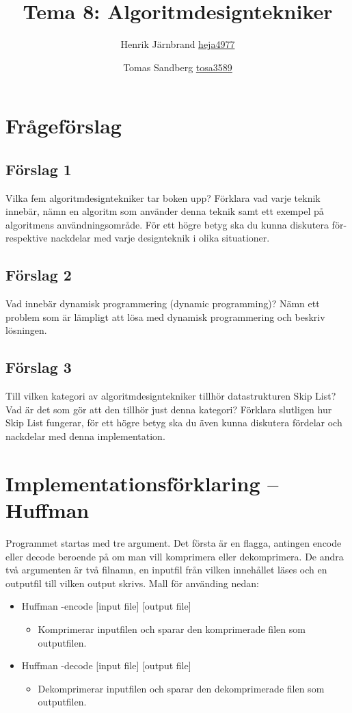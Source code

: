 \documentclass[a5paper,10pt,oneside]{article}
\title{Tema 8: Algoritmdesigntekniker}
\author{Henrik Järnbrand \url{heja4977} \and Tomas Sandberg \url{tosa3589}}
\begin{document}
\maketitle

\section{Frågeförslag}

\subsection{Förslag 1}
Vilka fem algoritmdesigntekniker tar boken upp? Förklara vad varje teknik innebär, nämn en algoritm som använder denna teknik samt ett exempel på algoritmens användningsområde. 
För ett högre betyg ska du kunna diskutera för- respektive nackdelar med varje 
designteknik i olika situationer.

\subsection{Förslag 2}
Vad innebär dynamisk programmering (dynamic programming)? Nämn ett problem som är lämpligt att lösa med dynamisk programmering och beskriv lösningen.

\subsection{Förslag 3}
Till vilken kategori av algoritmdesigntekniker tillhör datastrukturen Skip List?
Vad är det som gör att den tillhör just denna kategori?
Förklara slutligen hur Skip List fungerar, för ett högre betyg ska du även kunna diskutera fördelar och nackdelar med denna implementation.



\section{Implementationsförklaring – Huffman}

Programmet startas med tre argument. Det första är en flagga, antingen encode eller decode beroende på om man vill komprimera eller dekomprimera. De andra två argumenten är två filnamn, en inputfil från vilken innehållet läses och en outputfil till vilken output skrivs. Mall för använding nedan:

\begin{itemize}[label={}]
	\item Huffman -encode [input file] [output file]
	\begin{itemize}[label={}]
		\item Komprimerar inputfilen och sparar den komprimerade filen som outputfilen.
	\end{itemize}
	
	\item Huffman -decode [input file] [output file]
	\begin{itemize}[label={}]
		\item Dekomprimerar inputfilen och sparar den dekomprimerade filen som outputfilen.
	\end{itemize}
	
\end{itemize}
\end{document}
